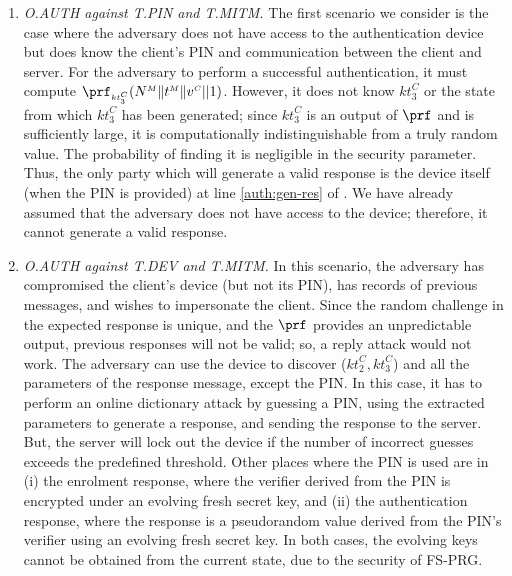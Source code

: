 \documentclass[runningheads]{llncs}
\newcommand{\sss}{\scriptscriptstyle}
\newcommand{\nonce}{\ensuremath{{N}}}
\newcommand{\keyt}{\ensuremath{{kt}}}
\newcommand{\trans}{\ensuremath{{t}}}
\renewcommand{\verifier}{\ensuremath{{v}}}
\newcommand{\VC}[1]{\ensuremath{#1^{\sss C}}}
\newcommand{\VM}[1]{\ensuremath{#1^{\sss M}}}
\begin{document}
\begin{enumerate}

\item\textit{O.AUTH against 
T.PIN and T.MITM.}  The first scenario we consider is the case where the adversary does not have
access to the authentication device but does know the client's PIN and communication between the client and server.  For the adversary to perform a successful authentication, it must compute $\prf_{\sss\VC{\keyt_{\sss 3}}}(\VM{\nonce} \|  \VM{\trans} \| \VC{\verifier}|| 1)$. However, it does not know \VC{\keyt_{\sss 3}} or the state from which \VC{\keyt_{\sss 3}} has been generated; since  \VC{\keyt_{\sss 3}} is an output of $\prf$ and is sufficiently large, it is computationally indistinguishable from a truly random value.  The probability of finding it is negligible in the security parameter.  Thus, the only party which will generate a valid response is the device itself (when the PIN is provided) at line \ref{auth:gen-res} of .  We have already assumed that the adversary does not have access to the device; therefore, it cannot generate a valid response.

\item\textit{O.AUTH against T.DEV and T.MITM.}\label{O.AUTH:T.DEV-plus-T.MITM}
In this scenario, the adversary has compromised the client's device (but not its PIN), has records of previous messages, and wishes to impersonate the client.
%
Since the random challenge in the expected response is unique, and the $\prf$ provides an unpredictable output, previous responses will not be valid; so, a reply attack would not work. The adversary can use the device to discover ($\VC{\keyt_{\sss 2}}, \VC{\keyt_{\sss 3}}$) and all the parameters of the response message, except the PIN. In this case, it has to perform an online dictionary attack by guessing a PIN, using the extracted parameters to generate a response, and sending the response to the server. But, the server will lock out the device if the number of incorrect guesses exceeds the predefined threshold. Other places where the PIN is used are in (i) the enrolment response, where the verifier derived from the PIN is encrypted under an evolving fresh secret key, and (ii) the authentication response, where the response is a pseudorandom value derived from the PIN's verifier using an evolving fresh secret key. In both cases, the evolving keys cannot be obtained from the current state, due to the security of FS-PRG. 




\end{enumerate}
\end{document}
